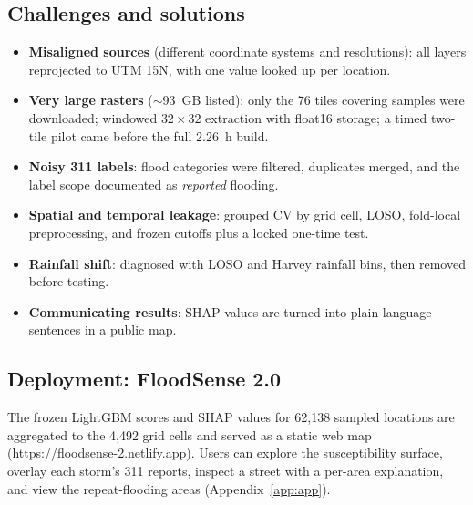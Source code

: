 \documentclass{article}
\begin{document}
\subsection{Challenges and solutions}
\begin{itemize}
\item \textbf{Misaligned sources} (different coordinate systems and resolutions): all layers reprojected to UTM 15N, with one value looked up per location.
\item \textbf{Very large rasters} ($\sim$93~GB listed): only the 76 tiles covering samples were downloaded; windowed $32\times32$ extraction with float16 storage; a timed two-tile pilot came before the full 2.26~h build.
\item \textbf{Noisy 311 labels}: flood categories were filtered, duplicates merged, and the label scope documented as \emph{reported} flooding.
\item \textbf{Spatial and temporal leakage}: grouped CV by grid cell, LOSO, fold-local preprocessing, and frozen cutoffs plus a locked one-time test.
\item \textbf{Rainfall shift}: diagnosed with LOSO and Harvey rainfall bins, then removed before testing.
\item \textbf{Communicating results}: SHAP values are turned into plain-language sentences in a public map.
\end{itemize}

\subsection{Deployment: FloodSense 2.0}
The frozen LightGBM scores and SHAP values for 62,138 sampled locations are aggregated to the 4,492 grid cells and served as a static web map (\url{https://floodsense-2.netlify.app}). Users can explore the susceptibility surface, overlay each storm's 311 reports, inspect a street with a per-area explanation, and view the repeat-flooding areas (Appendix~\ref{app:app}).

\end{document}
